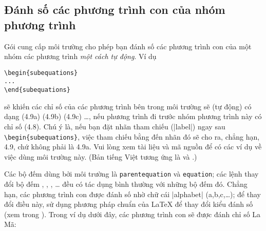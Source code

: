 \subsection{Đánh số các phương trình con của nhóm phương trình}

Gói  cung cấp môi trường  cho phép
bạn đánh số các phương trình con của một nhóm các phương trình
\emph{một cách tự động}. Ví dụ

\medskip
\begin{verbatim}
\begin{subequations}
...
\end{subequations}
\end{verbatim}

\medskip
\noindent
sẽ khiến các chỉ số của các phương trình bên trong môi trường
 sẽ (tự động) có dạng (4.9a) (4.9b) (4.9c) \dots,
nếu phương trình đi trước nhóm phương trình này có chỉ số (4.8).
Chú ý là, nếu bạn đặt nhãn tham chiếu (|label|) ngay sau
\verb/\begin{subequations}/, việc tham chiếu bằng 
đến nhãn đó sẽ cho ra, chẳng hạn, 4.9, chứ không phải là 4.9a.
Vui lòng xem tài liệu  và mã nguồn 
để có các ví dụ về việc dùng môi trường này. (Bản tiếng Việt tương ứng
là  và .)

\medskip
Các bộ đếm dùng bởi môi trường  là \verb/parentequation/
và \verb/equation/; các lệnh thay đổi bộ đếm
, , , \ldots
đều có tác dụng bình thường với những bộ đếm đó.
Chẳng hạn, các phương trình con được đánh số nhờ chữ cái |alphabet|
(a,b,c,\ldots); để thay đổi điều này, sử dụng phương pháp chuẩn
của \LaTeX{} để thay đổi kiểu đánh số (xem trong \cite[\S6.3, \S C.8.4]{lamport}).
Trong ví dụ dưới đây, các phương trình con sẽ được đánh chỉ số La Mã:

